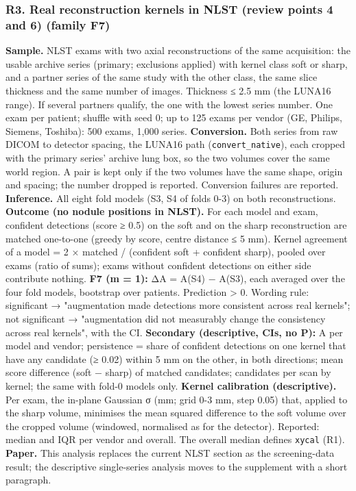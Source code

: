\subsubsection*{R3. Real reconstruction kernels in NLST (review points 4 and 6) (family F7)}
\textbf{Sample.} NLST exams with two axial reconstructions of the same acquisition: the usable archive series (primary; exclusions applied) with kernel class soft or sharp, and a partner series of the same study with the other class, the same slice thickness and the same number of images. Thickness ≤ 2.5 mm (the LUNA16 range). If several partners qualify, the one with the lowest series number. One exam per patient; shuffle with seed 0; up to 125 exams per vendor (GE, Philips, Siemens, Toshiba): 500 exams, 1,000 series. \textbf{Conversion.} Both series from raw DICOM to detector spacing, the LUNA16 path (\texttt{convert\_native}), each cropped with the primary series' archive lung box, so the two volumes cover the same world region. A pair is kept only if the two volumes have the same shape, origin and spacing; the number dropped is reported. Conversion failures are reported. \textbf{Inference.} All eight fold models (S3, S4 of folds 0-3) on both reconstructions. \textbf{Outcome (no nodule positions in NLST).} For each model and exam, confident detections (score ≥ 0.5) on the soft and on the sharp reconstruction are matched one-to-one (greedy by score, centre distance ≤ 5 mm). Kernel agreement of a model = 2 × matched / (confident soft + confident sharp), pooled over exams (ratio of sums); exams without confident detections on either side contribute nothing. \textbf{F7 (m = 1):} ΔA = A(S4) − A(S3), each averaged over the four fold models, bootstrap over patients. Prediction \textgreater{} 0. Wording rule: significant → "augmentation made detections more consistent across real kernels"; not significant → "augmentation did not measurably change the consistency across real kernels", with the CI. \textbf{Secondary (descriptive, CIs, no P):} A per model and vendor; persistence = share of confident detections on one kernel that have any candidate (≥ 0.02) within 5 mm on the other, in both directions; mean score difference (soft − sharp) of matched candidates; candidates per scan by kernel; the same with fold-0 models only. \textbf{Kernel calibration (descriptive).} Per exam, the in-plane Gaussian σ (mm; grid 0-3 mm, step 0.05) that, applied to the sharp volume, minimises the mean squared difference to the soft volume over the cropped volume (windowed, normalised as for the detector). Reported: median and IQR per vendor and overall. The overall median defines \texttt{xycal} (R1). \textbf{Paper.} This analysis replaces the current NLST section as the screening-data result; the descriptive single-series analysis moves to the supplement with a short paragraph.


